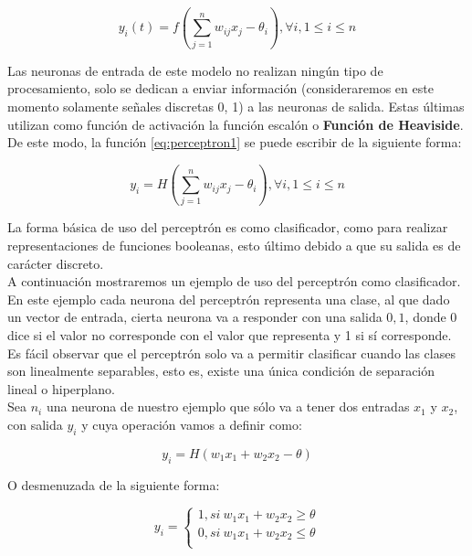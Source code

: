 \begin{equation}
  \label{eq:perceptron1}
y_i(t) = f(\sum_{j=1}^nw_{ij}x_j-\theta_i), \forall i, 1 \leq i \leq n
\end{equation}

Las neuronas de entrada de este modelo no realizan ningún tipo de
procesamiento, solo se dedican a enviar información (consideraremos en
este momento solamente señales discretas {0, 1}) a las neuronas de
salida. Estas últimas utilizan como función de activación la función
escalón o \textbf{Función de Heaviside}. De este modo, la función
\ref{eq:perceptron1} se puede escribir de la siguiente forma:

\begin{equation}
  y_i = H(\sum_{j=1}^nw_{ij}x_j-\theta_i), \forall i, 1 \leq i \leq n
\end{equation}

La forma básica de uso del perceptrón es como clasificador, como para
realizar representaciones de funciones booleanas, esto último debido a
que su salida es de carácter discreto.\\

A continuación mostraremos un ejemplo de uso del perceptrón como
clasificador. En este ejemplo cada neurona del perceptrón representa
una clase, al que dado un vector de entrada, cierta neurona va a
responder con una salida ${0,1}$, donde 0 dice si el valor no
corresponde con el valor que representa y 1 si sí corresponde. Es
fácil observar que el perceptrón solo va a permitir clasificar cuando
las clases son linealmente separables, esto es, existe una única
condición de separación lineal o hiperplano.\\

Sea $n_i$ una neurona de nuestro ejemplo que sólo va a tener dos
entradas $x_1$ y $x_2$, con salida $y_i$ y cuya operación vamos a
definir como:

\begin{equation}
  y_i = H(w_1x_1 + w_2x_2 - \theta)
\end{equation}

O desmenuzada de la siguiente forma:

\begin{equation}
  y_i  =
  \begin{cases}
    1, si\ w_1x_1 + w_2x_2 \geq \theta\\
    0, si\ w_1x_1 + w_2x_2 \le \theta\\
  \end{cases}
\end{equation}

